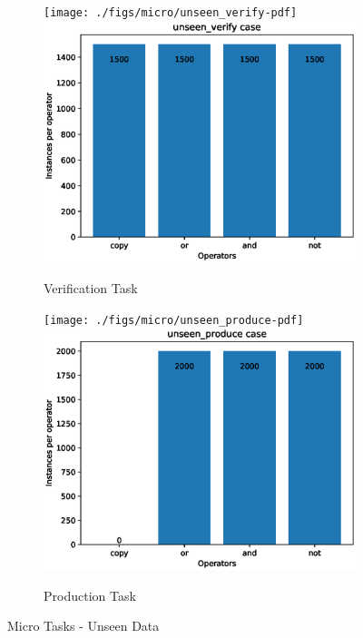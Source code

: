 \begin{figure}[ht] 
	\begin{subfigure}[b]{0.5\linewidth}
		\centering
		\ifpdf
		\texttt{[image: ./figs/micro/unseen\_verify-pdf]}
		\else
		\includegraphics[width=0.95\linewidth]{./figs/micro/unseen_verify-eps}
		\fi
		\caption{Verification Task} 
		\label{un_ver} 
		\vspace{2ex}
	\end{subfigure}%
	\begin{subfigure}[b]{0.5\linewidth}
		\centering
		\ifpdf
		\texttt{[image: ./figs/micro/unseen\_produce-pdf]}
		\else
		\includegraphics[width=0.95\linewidth]{./figs/micro/unseen_produce-eps}
		\fi 
		\caption{Production Task} 
		\label{un_prd} 
		\vspace{2ex}
	\end{subfigure}
	\caption{Micro Tasks - Unseen Data}
	\label{micro_test}
\end{figure}

